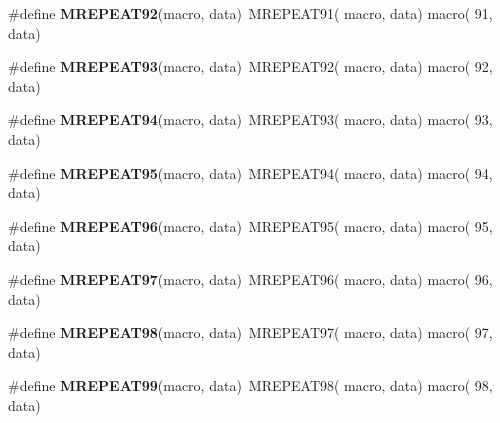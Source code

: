 \begin{DoxyCompactItemize}
\item 
\hypertarget{group__group__sam0__utils__mrepeat_gad0cb974b5c2b9677a0127be09057faaf}{}\#define {\bfseries M\+R\+E\+P\+E\+A\+T92}(macro,  data)~M\+R\+E\+P\+E\+A\+T91( macro, data)   macro( 91, data)\label{group__group__sam0__utils__mrepeat_gad0cb974b5c2b9677a0127be09057faaf}

\item 
\hypertarget{group__group__sam0__utils__mrepeat_gaa8143ea25cb446fb9e5afa4f79a7fbd8}{}\#define {\bfseries M\+R\+E\+P\+E\+A\+T93}(macro,  data)~M\+R\+E\+P\+E\+A\+T92( macro, data)   macro( 92, data)\label{group__group__sam0__utils__mrepeat_gaa8143ea25cb446fb9e5afa4f79a7fbd8}

\item 
\hypertarget{group__group__sam0__utils__mrepeat_ga44f7fcb2a7286d5d105c9d25f400aec2}{}\#define {\bfseries M\+R\+E\+P\+E\+A\+T94}(macro,  data)~M\+R\+E\+P\+E\+A\+T93( macro, data)   macro( 93, data)\label{group__group__sam0__utils__mrepeat_ga44f7fcb2a7286d5d105c9d25f400aec2}

\item 
\hypertarget{group__group__sam0__utils__mrepeat_ga40aa5234382c6c5f3f60df82c0dbaa40}{}\#define {\bfseries M\+R\+E\+P\+E\+A\+T95}(macro,  data)~M\+R\+E\+P\+E\+A\+T94( macro, data)   macro( 94, data)\label{group__group__sam0__utils__mrepeat_ga40aa5234382c6c5f3f60df82c0dbaa40}

\item 
\hypertarget{group__group__sam0__utils__mrepeat_ga0b773eb3863eaca9403e8db99a4073e6}{}\#define {\bfseries M\+R\+E\+P\+E\+A\+T96}(macro,  data)~M\+R\+E\+P\+E\+A\+T95( macro, data)   macro( 95, data)\label{group__group__sam0__utils__mrepeat_ga0b773eb3863eaca9403e8db99a4073e6}

\item 
\hypertarget{group__group__sam0__utils__mrepeat_ga657eb71671586947acb4f1d9eea4ad80}{}\#define {\bfseries M\+R\+E\+P\+E\+A\+T97}(macro,  data)~M\+R\+E\+P\+E\+A\+T96( macro, data)   macro( 96, data)\label{group__group__sam0__utils__mrepeat_ga657eb71671586947acb4f1d9eea4ad80}

\item 
\hypertarget{group__group__sam0__utils__mrepeat_ga5488749314737100b1d663aecd83026c}{}\#define {\bfseries M\+R\+E\+P\+E\+A\+T98}(macro,  data)~M\+R\+E\+P\+E\+A\+T97( macro, data)   macro( 97, data)\label{group__group__sam0__utils__mrepeat_ga5488749314737100b1d663aecd83026c}

\item 
\hypertarget{group__group__sam0__utils__mrepeat_ga6f0bcd4130a9efc978ec43537d0ccb57}{}\#define {\bfseries M\+R\+E\+P\+E\+A\+T99}(macro,  data)~M\+R\+E\+P\+E\+A\+T98( macro, data)   macro( 98, data)\label{group__group__sam0__utils__mrepeat_ga6f0bcd4130a9efc978ec43537d0ccb57}


\end{DoxyCompactItemize}

